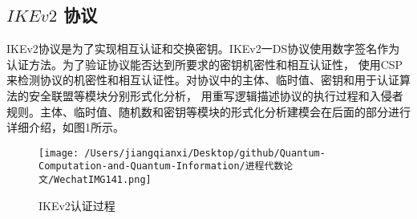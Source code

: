 \documentclass[UTF8]{ctexart}
\begin{document}
    \subsection{ $IKEv2$ 协议}
    \par{
        IKEv2协议是为了实现相互认证和交换密钥。IKEv2一DS协议使用数字签名作为认证方法。为了验证协议能否达到所要求的密钥机密性和相互认证性，
        使用CSP来检测协议的机密性和相互认证性。对协议中的主体、临时值、密钥和用于认证算法的安全联盟等模块分别形式化分析，
        用重写逻辑描述协议的执行过程和入侵者规则。主体、临时值、随机数和密钥等模块的形式化分析建模会在后面的部分进行详细介绍，如图1所示。 
		\begin{figure}[h]
			\centering
			\texttt{[image: /Users/jiangqianxi/Desktop/github/Quantum-Computation-and-Quantum-Information/进程代数论文/WechatIMG141.png]}
			\caption{IKEv2认证过程}
			\end{figure}
		}
\end{document}
